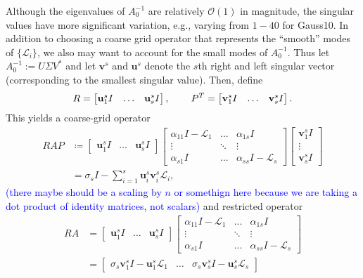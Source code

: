 \documentclass[a4paper,10pt]{article}
\newcommand{\tcb}{\textcolor{blue}}
\begin{document}
Although the eigenvalues of $A_0^{-1}$ are relatively $\mathcal{O}(1)$ in magnitude,
the singular values have more significant variation, e.g., varying from $1-40$ for
Gauss10. In addition to choosing a coarse grid operator that represents the ``smooth''
modes of $\{\mathcal{L}_i\}$, we also may want to account for the small modes of
$A_0^{-1}$. Thus let $A_0^{-1} := U\Sigma V^*$ and let $\mathbf{v}^s$ and
$\mathbf{u}^s$ denote the $s$th right and left singular vector (corresponding
to the smallest singular value). Then, define 
%
\begin{align*} 
R = \begin{bmatrix} \mathbf{u}^s_1 I & \hdots & \mathbf{u}^s_s I \end{bmatrix},
\hspace{5ex}
P^T = \begin{bmatrix} \mathbf{v}^s_1 I & \hdots & \mathbf{v}^s_s I \end{bmatrix}.
\end{align*}
%
This yields a coarse-grid operator
%
\begin{align}\nonumber
RAP & \coloneqq \begin{bmatrix} \mathbf{u}^s_1 I & \hdots & \mathbf{u}^s_s I \end{bmatrix}
	\begin{bmatrix} \alpha_{11} I - \mathcal{L}_1 & ... & \alpha_{1s}I  \\
		\vdots & \ddots & \vdots \\ \alpha_{s1}I &  ... & \alpha_{ss}I - \mathcal{L}_s\end{bmatrix}
	\begin{bmatrix} \mathbf{v}^s_1 I \\ \vdots \\ \mathbf{v}^s_s I\end{bmatrix} \\
& = \sigma_sI - \sum_{i=1}^s \mathbf{u}^s_i\mathbf{v}^s_i\mathcal{L}_i \label{eq:cg_sv},
\end{align}
%
\tcb{(there maybe should be a scaling by $n$ or somethign here because we are
taking a dot product of identity matrices, not scalars)} and restricted operator
%
\begin{align}\nonumber
RA & = \begin{bmatrix} \mathbf{u}^s_1 I & \hdots & \mathbf{u}^s_s I \end{bmatrix}
	\begin{bmatrix} \alpha_{11} I - \mathcal{L}_1 & ... & \alpha_{1s}I  \\
		\vdots & \ddots & \vdots \\ \alpha_{s1}I &  ... & \alpha_{ss}I - \mathcal{L}_s\end{bmatrix} \\
& = \begin{bmatrix} \sigma_s\mathbf{v}^s_1I - \mathbf{u}^s_1 \mathcal{L}_1 & \hdots &
	\sigma_s\mathbf{v}^s_sI - \mathbf{u}^s_s \mathcal{L}_s \end{bmatrix}\label{eq:ra_sv}
\end{align}
%
\end{document}
